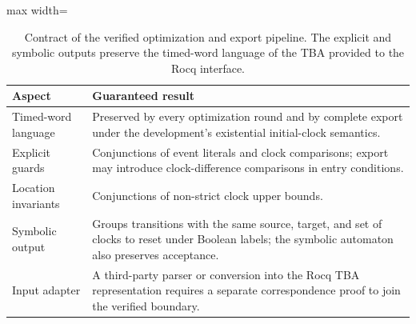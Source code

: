 \begin{table}[t]
\centering
\caption{Contract of the verified optimization and export pipeline. The
explicit and symbolic outputs preserve the timed-word language of the TBA
provided to the Rocq interface.}
\label{tab:export-contract}
\small
\begin{adjustbox}{max width=\textwidth}\begin{tabular}{@{}p{}p{}@{}}
\toprule
Aspect & Guaranteed result\\
\midrule
Timed-word language & Preserved by every optimization round and by complete export under the development's existential initial-clock semantics.\\
Explicit guards & Conjunctions of event literals and clock comparisons; export may introduce clock-difference comparisons in entry conditions.\\
Location invariants & Conjunctions of non-strict clock upper bounds.\\
Symbolic output & Groups transitions with the same source, target, and set of clocks to reset under Boolean labels; the symbolic automaton also preserves acceptance.\\
Input adapter & A third-party parser or conversion into the Rocq TBA representation requires a separate correspondence proof to join the verified boundary.\\
\bottomrule
\end{tabular}\end{adjustbox}
\end{table}

